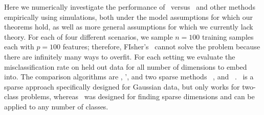 \documentclass[10pt]{article}
\begin{document}
Here we numerically investigate the performance of \Lol~versus \Pca~and other methods empirically using simulations, both under the model assumptions for which our theorems hold, as well as more general assumptions for which we currently lack theory.
For each of four different scenarios, we sample 
$n=100$ training samples each with  $p=100$ features; therefore, FIsher's \Lda~cannot solve the problem because there are infinitely many ways to overfit.  
For each setting we evaluate the misclassification rate on held out data for all number of dimensions to embed into.  The comparison algorithms are \Pca, \Pca', and two sparse methods \Lasso~\cite{Zou2006a}, and \Road~\cite{Fan2012a}. \Road~is a sparse approach specifically designed for  Gaussian data, but only works for two-class problems, whereas \Lasso~was designed for finding sparse dimensions and can be applied to any number of classes.  
\end{document}
